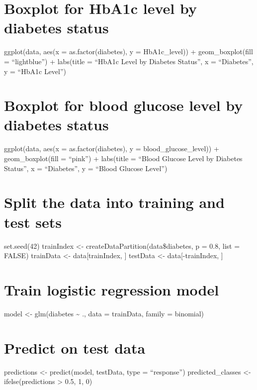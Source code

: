 \documentclass[
]{article}
\begin{document}
\hypertarget{boxplot-for-hba1c-level-by-diabetes-status}{%
\section{Boxplot for HbA1c level by diabetes
status}\label{boxplot-for-hba1c-level-by-diabetes-status}}

ggplot(data, aes(x = as.factor(diabetes), y = HbA1c\_level)) +
geom\_boxplot(fill = ``lightblue'') + labs(title = ``HbA1c Level by
Diabetes Status'', x = ``Diabetes'', y = ``HbA1c Level'')

\hypertarget{boxplot-for-blood-glucose-level-by-diabetes-status}{%
\section{Boxplot for blood glucose level by diabetes
status}\label{boxplot-for-blood-glucose-level-by-diabetes-status}}

ggplot(data, aes(x = as.factor(diabetes), y = blood\_glucose\_level)) +
geom\_boxplot(fill = ``pink'') + labs(title = ``Blood Glucose Level by
Diabetes Status'', x = ``Diabetes'', y = ``Blood Glucose Level'')

\hypertarget{split-the-data-into-training-and-test-sets}{%
\section{Split the data into training and test
sets}\label{split-the-data-into-training-and-test-sets}}

set.seed(42) trainIndex \textless- createDataPartition(data\$diabetes, p
= 0.8, list = FALSE) trainData \textless- data{[}trainIndex, {]}
testData \textless- data{[}-trainIndex, {]}

\hypertarget{train-logistic-regression-model}{%
\section{Train logistic regression
model}\label{train-logistic-regression-model}}

model \textless- glm(diabetes \textasciitilde{} ., data = trainData,
family = binomial)

\hypertarget{predict-on-test-data}{%
\section{Predict on test data}\label{predict-on-test-data}}

predictions \textless- predict(model, testData, type = ``response'')
predicted\_classes \textless- ifelse(predictions \textgreater{} 0.5, 1,
0)
\end{document}
